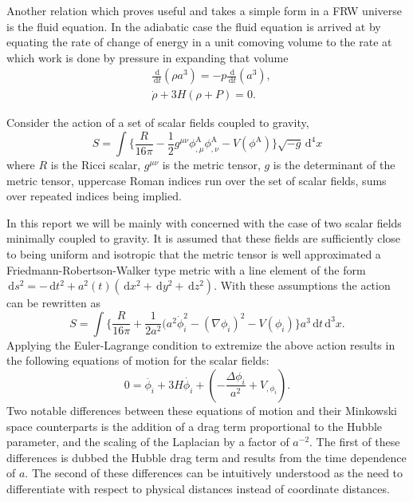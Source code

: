 \documentclass[letterpaper,11pt]{article}
\newcommand{\ud}{\,\mathrm{d}}
\begin{document}
Another relation which proves useful and takes a simple form in a FRW universe is the fluid equation. In the adiabatic case the fluid equation is arrived at by equating the rate of change of energy in a unit comoving volume to the rate at which work is done by pressure in expanding that volume
\begin{align}
&\frac{\ud}{\ud t}(\rho a^3)=-p\frac{\ud}{\ud t}(a^3),\\
&\dot{\rho}+3H(\rho +P)=0. \label{fluid eqn}
\end{align}


Consider the action of a set of scalar fields coupled to gravity,
\begin{equation}
S=\int \Big\{ \frac{R}{16\pi} - \frac{1}{2}g^{\mu \nu} \phi_{,\mu}^{\mathrm{A}} \phi_{,\nu}^{\mathrm{A}}-V(\phi^{\mathrm{A}}) \Big\} \sqrt{-g}\ud^4x
\end{equation}
where $R$ is the Ricci scalar, $g^{\mu \nu}$ is the metric tensor, $g$ is the determinant of the metric tensor, uppercase Roman indices run over the set of scalar fields, sums over repeated indices being implied. %

In this report we will be mainly with concerned with the case of two scalar fields minimally coupled to gravity. It is assumed that these fields are sufficiently close to being uniform and isotropic that the metric tensor is well approximated a Friedmann-Robertson-Walker type metric with a line element of the form $\ud s^2=-\ud t^2+a^2(t)(\ud x^2+\ud y^2+\ud z^2)$. With these assumptions the action can be rewritten as
\begin{equation}
S=\int \Big\{ \frac{R}{16 \pi}+\frac{1}{2a^2}(a^2 \dot{\phi}^2_i - (\nabla{\phi_i})^2 - V(\phi_i) \Big\}a^3\ud t\ud^3x.
\end{equation}
Applying the Euler-Lagrange condition to extremize the above action results in the following equations of motion for the scalar fields:
\begin{equation}
0=\ddot{\phi_i}+3H\dot{\phi_i}+(-\frac{\Delta \phi_i}{a^2}+V_{,\phi_i}). \label{eom phi}
\end{equation}
Two notable differences between these equations of motion and their Minkowski space counterparts is the addition of a drag term proportional to the Hubble parameter, and the scaling of the Laplacian by a factor of $a^{-2}$. The first of these differences is dubbed the Hubble drag term and results from the time dependence of $a$. The second of these differences can be intuitively understood as the need to differentiate with respect to physical distances instead of coordinate distances.
\end{document}
